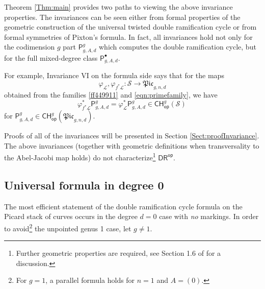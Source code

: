 \documentclass[a4paper,12pt]{article} %
\newcommand{\ca}[1]{{\mathcal{#1}}}
\def\P{\mathsf{P}}
\theoremstyle{definition}
\theoremstyle{plain}%
\renewcommand{\phi}{\varphi}
\newcommand{\Picabs}{\mathfrak{Pic}}
\newcommand{\Chow}{\mathsf{CH}}
\newcommand{\CHop}{\Chow_{\mathsf{op}}}
\newcommand{\invnrIV}{VI}
\newcommand{\DRop}{\mathsf{DR}^{\mathsf{op}}}
\begin{document}
\vspace{10pt}
Theorem \ref{Thm:main} provides two paths to viewing 
the  above  invariance properties. The invariances can be 
seen
either from
formal
properties of the
geometric construction of the universal twisted double ramification
cycle or from formal symmetries of
Pixton's formula. In fact, all invariances hold not only for the codimension $g$ part $\P^g_{g,A,d}$ which computes the double ramification cycle, but for the full mixed-degree class $\P_{g,A,d}^\bullet$.

For example, Invariance \invnrIV{} on the 
formula side says that for the maps 
\[\phi_{\ca L}, \phi_{f^* \ca L} : \ca S \to \Picabs_{g,n,d}\]
obtained from the families  \eqref{ff449911} and \eqref{eqn:primefamily}, we have  
\[\phi_{f^* \ca L}^* \P^g_{g,A,d}=
\phi_{\ca L}^* \P^g_{g,A,d}  \in \mathsf{CH}^g_{\mathsf{op}}(\mathcal{S})\,  \] 
 for
$\P^g_{g,A,d} \in \CHop^g(\Picabs_{g,n,d})$.

Proofs of all of the invariances
will be presented in Section \ref{Sect:proofInvariance}.
The above invariances (together with geometric definitions
when transversality to the Abel-Jacobi map holds)  do not
characterize{\footnote {Further geometric properties are
required, see Section 1.6 of \cite{HolSch} for a discussion.}} 
$\DRop$. 

\subsection{Universal formula in degree 0}\label{sec:intro_deg_0}
The most efficient statement of the double ramification cycle formula
on the Picard stack of curves occurs in the degree $d=0$ case with {\em no} markings. 
In order to avoid{\footnote{For $g=1$, a parallel formula holds for $n=1$ and $A=(0)$.}} the unpointed genus 1 case, let $g\neq 1$.  
\end{document}
